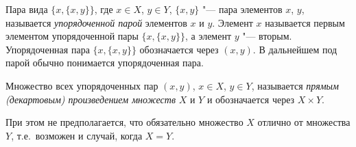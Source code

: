 \begin{defn}
Пара вида $\{x,\{x,y\}\}$, где $x\in X$, $y\in Y$, $\{x,y\}$ "--- пара элементов $x$, $y$, называется \textit{упорядоченной парой} элементов $x$ и $y$. Элемент $x$ называется первым элементом упорядоченной пары $\{x,\{x,y\}\}$, а элемент $y$ "--- вторым. Упорядоченная пара $\{x,\{x,y\}\}$ обозначается через $(x,y)$. В дальнейшем под парой обычно понимается упорядоченная пара.
\end{defn}

\begin{defn}
Множество всех упорядоченных пар $(x,y)$, $x\in X$, $y \in Y$, называется \textit{прямым (декартовым) произведением множеств} $X$ и $Y$ и обозначается через $X\times Y$. 
\end{defn}
При этом не предполагается, что обязательно множество $X$ отлично от множества $Y$, т.е.\ возможен и случай, когда $X = Y$.